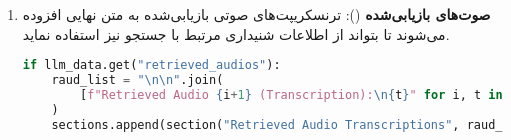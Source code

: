 \documentclass{article}
\begin{document}
\begin{enumerate}
    \item \textbf{صوت‌های بازیابی‌شده} ():
    ترنسکریپت‌های صوتی بازیابی‌شده به متن نهایی افزوده می‌شوند تا  بتواند از اطلاعات شنیداری مرتبط با جستجو نیز استفاده نماید.
    
    \begin{latin}
    \begin{lstlisting}[language=Python]
if llm_data.get("retrieved_audios"):
    raud_list = "\n\n".join(
        [f"Retrieved Audio {i+1} (Transcription):\n{t}" for i, t in enumerate(llm_data["retrieved_audios"])]
    )
    sections.append(section("Retrieved Audio Transcriptions", raud_list))
    \end{lstlisting}
    \end{latin}
\end{enumerate}
\end{document}
